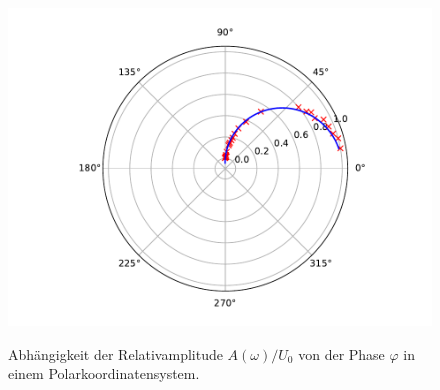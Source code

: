 \begin{figure}
    \centering
    \includegraphics[width=\textwidth]{content/data/plotd.pdf}
    \label{fig:polar}
    \caption{Abhängigkeit der Relativamplitude $A(\omega)/U_0$ von der Phase $\varphi$ in einem Polarkoordinatensystem.}
\end{figure}
\FloatBarrier

